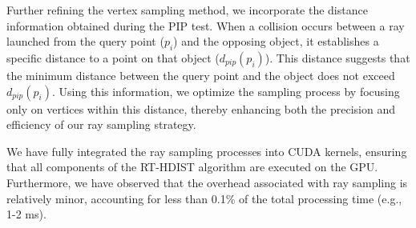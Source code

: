 Further refining the vertex sampling method, we incorporate the distance information obtained during the PIP test.
When a collision occurs between a ray launched from the query point ($p_i$) and the opposing object, it establishes a specific distance to a point on that object ($d_{pip}(p_i)$).
This distance suggests that the minimum distance between the query point and the object does not exceed $d_{pip}(p_i)$.
Using this information, we optimize the sampling process by focusing only on vertices within this distance, thereby enhancing both the precision and efficiency of our ray sampling strategy.

We have fully integrated the ray sampling processes into CUDA kernels, ensuring that all components of the RT-HDIST algorithm are executed on the GPU.
Furthermore, we have observed that the overhead associated with ray sampling is relatively minor, accounting for less than 0.1\% of the total processing time (e.g., 1-2 ms).

%

